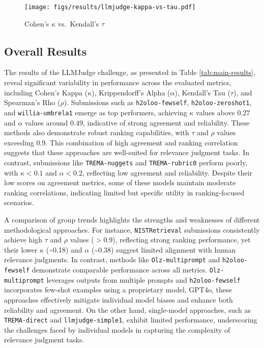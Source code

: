 \begin{figure}
    \centering
    \texttt{[image: figs/results/llmjudge-kappa-vs-tau.pdf]}
    \caption{Cohen's $\kappa$ vs.~Kendall's $\tau$}
    \label{fig:kappa-vs-tau}
\end{figure}

\subsection{Overall Results}
The results of the LLMJudge challenge, as presented in Table \ref{tab:main-results}, reveal significant variability in performance across the evaluated metrics, including Cohen's Kappa ($\kappa$), Krippendorff's Alpha ($\alpha$), Kendall's Tau ($\tau$), and Spearman’s Rho ($\rho$). Submissions such as \texttt{h2oloo-fewself}, \texttt{h2oloo-zeroshot1}, and \texttt{willia-umbrela1} emerge as top performers, achieving $\kappa$ values above $0.27$ and $\alpha$ values around $0.49$, indicative of strong agreement and reliability. These methods also demonstrate robust ranking capabilities, with $\tau$ and $\rho$ values exceeding $0.9$. This combination of high agreement and ranking correlation suggests that these approaches are well-suited for relevance judgment tasks. In contrast, submissions like \texttt{TREMA-nuggets} and \texttt{TREMA-rubric0} perform poorly, with $\kappa < 0.1$ and $\alpha < 0.2$, reflecting low agreement and reliability. Despite their low scores on agreement metrics, some of these models maintain moderate ranking correlations, indicating limited but specific utility in ranking-focused scenarios.

A comparison of group trends highlights the strengths and weaknesses of different methodological approaches. For instance, \texttt{NISTRetrieval} submissions consistently achieve high $\tau$ and $\rho$ values ($>0.9$), reflecting strong ranking performance, yet their lower $\kappa$ (\textasciitilde0.18) and $\alpha$ (\textasciitilde0.38) suggest limited alignment with human relevance judgments. In contrast, methods like \texttt{Olz-multiprompt} and \texttt{h2oloo-fewself} demonstrate comparable performance across all metrics. \texttt{Olz-multiprompt} leverages outputs from multiple prompts and \texttt{h2oloo-fewself} incorporates few-shot examples using a proprietary model, GPT4o, these approaches effectively mitigate individual model biases and enhance both reliability and agreement. On the other hand, single-model approaches, such as \texttt{TREMA-direct} and \texttt{llmjudge-simple1}, exhibit limited performance, underscoring the challenges faced by individual models in capturing the complexity of relevance judgment tasks.

